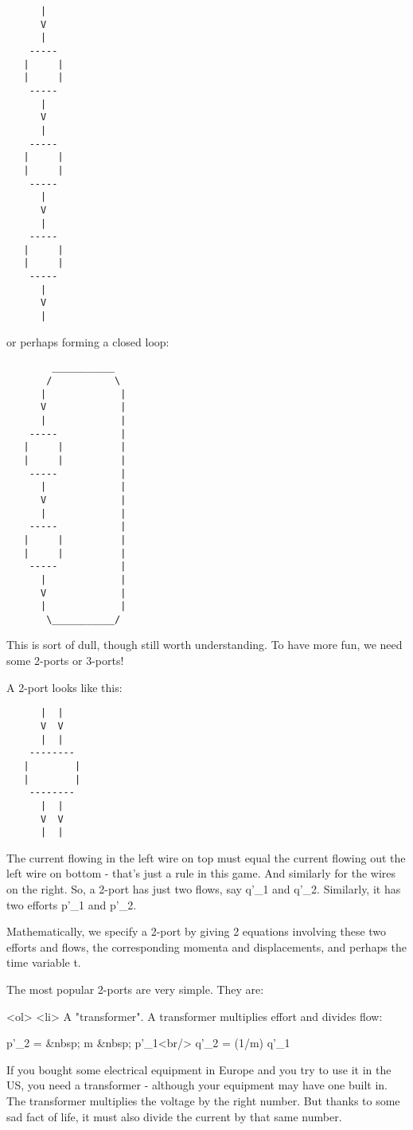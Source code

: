 \begin{verbatim}
      |
      V
      |
    -----
   |     |
   |     |
    -----
      |
      V
      |
    -----
   |     |
   |     |
    -----
      |
      V
      |
    -----
   |     |
   |     |
    -----
      |
      V
      |
\end{verbatim}
    

or perhaps forming a closed loop:

\begin{verbatim}
        ___________
       /           \
      |             |
      V             |
      |             |
    -----           |
   |     |          |
   |     |          |
    -----           |
      |             |
      V             |
      |             |
    -----           |
   |     |          |
   |     |          |
    -----           |
      |             |
      V             |
      |             |
       \___________/

\end{verbatim}
    

This is sort of dull, though still worth understanding.  To have more
fun, we need some 2-ports or 3-ports!

A 2-port looks like this:

\begin{verbatim}
      |  |
      V  V
      |  |
    --------
   |        |
   |        |
    --------
      |  |
      V  V
      |  |
\end{verbatim}
    

The current flowing in the left wire on top must equal the current
flowing out the left wire on bottom - that's just a rule in this game.
And similarly for the wires on the right.  So, a 2-port has just two
flows, say q'_{1} and q'_{2}.  Similarly, it has two
efforts p'_{1} and p'_{2}.

Mathematically, we specify a 2-port by giving 2 equations involving 
these two efforts and flows, the corresponding momenta and 
displacements, and perhaps the time variable t.

The most popular 2-ports are very simple.  They are:

<ol>
<li>
A "transformer".  A transformer multiplies effort and divides
  flow:

  p'_{2} =  &nbsp; m &nbsp;  p'_{1}<br/>
  q'_{2} = (1/m) q'_{1}

 If you bought some electrical equipment in Europe and you try to
 use it in the US, you need a transformer - although your equipment 
 may have one built in.  The transformer multiplies the voltage
 by the right number.  But thanks to some sad fact of life, it must
 also divide the current by that same number.  

